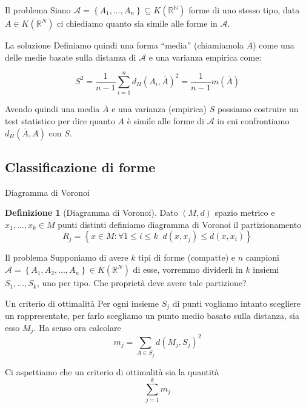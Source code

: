 \documentclass{beamer}
\newcounter{counter1}
\theoremstyle{plain}
\theoremstyle{definition}
\newtheorem{mydef}[counter1]{Definizione}
\theoremstyle{remark}
\newcommand{\obar}[1]{\overline{#1}}
\newcommand{\set}[1]{\left\{#1\right\}}
\begin{document}
\begin{frame}{Il problema}
  Siano $\mathcal{A} = \set{ A_1,...,A_n} \subseteq K(\mathbb{R^N})$
  forme di uno stesso tipo, data $A \in K(\mathbb{R}^N)$ ci chiediamo
  quanto sia simile alle forme in $\mathcal{A}$.
\end{frame}

\begin{frame}{La soluzione}
  Definiamo quindi una forma ``media'' (chiamiamola $\obar A$) come
  una delle medie basate sulla distanza di $\mathcal{A}$ e una
  varianza empirica come:

  \[ S^2 = \frac{1}{n-1} \sum _{i=1} ^n d_H(A_i , \obar A)^2 =
  \frac{1}{n-1} m(\obar A) \]

  Avendo quindi una media $\obar A$ e una varianza (empirica) $S$
  possiamo costruire un test statistico per dire quanto $A$ è simile
  alle forme di $\mathcal{A}$ in cui confrontiamo $d_H(\obar A, A)$
  con $S$.
\end{frame}


\subsection{Classificazione di forme}

\begin{frame}{Diagramma di Voronoi}
  \begin{mydef}[Diagramma di Voronoi]
    Dato $(M,d)$ spazio metrico e $x_1,...,x_k \in M$ punti distinti
    definiamo diagramma di Voronoi il partizionamento
    \[ R_j = \set{ x\in M : \forall 1 \le i \le k \;\; d(x,x_j) \le
      d(x,x_i) } \]
  \end{mydef}
\end{frame}

\begin{frame}{Il problema}
  Supponiamo di avere $k$ tipi di forme (compatte) e $n$ campioni
  $\mathcal{A} = \set{ A_1, A_2,..., A_n} \in K(\mathbb{R}^N)$ di esse,
  vorremmo dividerli in $k$ insiemi $S_1,...,S_k$, uno per tipo. Che
  proprietà deve avere tale partizione?
\end{frame}

\begin{frame}{Un criterio di ottimalità}
  Per ogni insieme $S_j$ di punti vogliamo intanto scegliere un
  rappresentate, per farlo scegliamo un punto medio basato sulla
  distanza, sia esso $M_j$. Ha senso ora calcolare
  \[ m_j = \sum _{A\in S_j} d(M_j,S_j)^2 \]
  
  \vfill

  Ci aspettiamo che un criterio di ottimalità sia la quantità
  \[ \sum _{j=1} ^k m_j \]
\end{frame}
\end{document}
